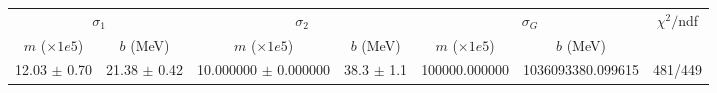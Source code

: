 \begin{tabular}{cc|cc|cc||c}
\multicolumn{2}{c|}{$\sigma_1$} & \multicolumn{2}{|c}{$\sigma_2$} & \multicolumn{2}{|c}{$\sigma_G$}  & \multirow{2}{*}{$\chi^2/$ndf}\\
$m$ ($\times1e5$) & $b$ (MeV) & $m$ ($\times1e5$) & $b$ (MeV) & $m$ ($\times1e5$) & $b$ (MeV) & \\
\hline
12.03 $\pm$ 0.70 & 21.38 $\pm$ 0.42 & 10.000000 $\pm$ 0.000000 & 38.3 $\pm$ 1.1 & 100000.000000 & 1036093380.099615 & 481/449\\
\end{tabular}
